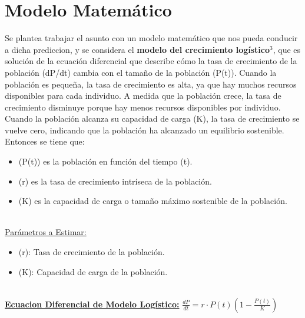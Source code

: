 \documentclass[a4paper,10pt,twocolumn]{article}
\begin{document}
\section{Modelo Matemático}\label{sec:dev}
 Se plantea trabajar el asunto con un modelo matemático que nos pueda conducir a dicha prediccion, y se considera 
 el \textbf{modelo del crecimiento logístico}$^{3}$, que es solución de la ecuación diferencial que describe cómo la tasa de crecimiento de la población (dP/dt) 
 cambia con el tamaño de la población (P(t)). Cuando la población es pequeña, la tasa de crecimiento es alta, ya que 
 hay muchos recursos disponibles para cada individuo. A medida que la población crece, la tasa de crecimiento disminuye 
 porque hay menos recursos disponibles por individuo. Cuando la población alcanza su capacidad de carga (K), la tasa 
 de crecimiento se vuelve cero, indicando que la población ha alcanzado un equilibrio sostenible.\\
 Entonces se tiene que:
\begin{itemize}
    \item (P(t)) es la población en función del tiempo (t).
    \item (r) es la tasa de crecimiento intríseca de la población.
    \item (K) es la capacidad de carga o tamaño máximo sostenible de la población.
\end{itemize}\\
\underline{Parámetros a Estimar:}
\begin{itemize}
    \item (r): Tasa de crecimiento  de la población. 
    \item (K): Capacidad de carga de la población.
\end{itemize}\\
\textbf{\underline{Ecuacion Diferencial de Modelo Logístico:}} $\frac{dP}{dt} = r \cdot P(t)(1 - \frac{P(t)}{K}) $\\\\
\end{document}
